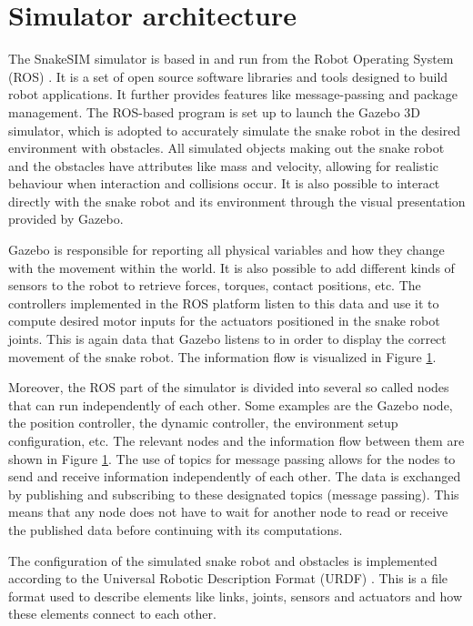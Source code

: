 \section{Simulator architecture}

The SnakeSIM simulator is based in and run from the Robot Operating System (ROS) \cite{quigley2009ros}. It is a set of open source software libraries and tools designed to build robot applications. It further provides features like message-passing and package management. The ROS-based program is set up to launch the Gazebo 3D simulator, which is adopted to accurately simulate the snake robot in the desired environment with obstacles. All simulated objects making out the snake robot and the obstacles have attributes like mass and velocity, allowing for realistic behaviour when interaction and collisions occur.
It is also possible to interact directly with the snake robot and its environment through the visual presentation provided by Gazebo.

Gazebo is responsible for reporting all physical variables and how they change with the movement within the world. It is also possible to add different kinds of sensors to the robot to retrieve forces, torques, contact positions, etc. The controllers implemented in the ROS platform listen to this data and use it to compute desired motor inputs for the actuators positioned in the snake robot joints. This is again data that Gazebo listens to in order to display the correct movement of the snake robot. The information flow is visualized in Figure \ref{}.

Moreover, the ROS part of the simulator is divided into several so called nodes that can run independently of each other. Some examples are the Gazebo node, the position controller, the dynamic controller, the environment setup configuration, etc. The relevant nodes and the information flow between them are shown in Figure \ref{}. The use of topics for message passing allows for the nodes to send and receive information independently of each other. The data is exchanged by publishing and subscribing to these designated topics (message passing). This means that any node does not have to wait for another node to read or receive the published data before continuing with its computations.

The configuration of the simulated snake robot and obstacles is implemented according to the Universal Robotic Description Format (URDF) \cite{}. This is a file format used to describe elements like links, joints, sensors and actuators and how these elements connect to each other.